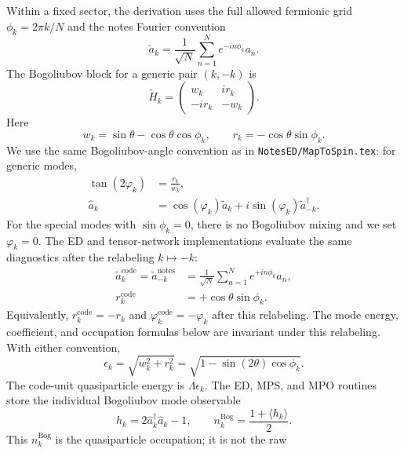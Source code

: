 \documentclass[aps,pra,twocolumn,superscriptaddress,nolongbibliography,nobalancelastpage,10pt]{revtex4-2}
\begin{document}
Within a fixed sector, the derivation uses the full allowed fermionic grid
$\phi_k=2\pi k/N$ and the notes Fourier convention
\begin{equation}
	\tilde a_k=\frac{1}{\sqrt N}\sum_{n=1}^{N}e^{-in\phi_k}a_n .
\end{equation}
The Bogoliubov block for a generic pair $(k,-k)$ is
\begin{equation}
	\tilde H_k=
	\begin{pmatrix}
		w_k & i r_k\\
		-i r_k & -w_k
	\end{pmatrix}.
\end{equation}
Here
\begin{equation}
	w_k=\sin\theta-\cos\theta\cos\phi_k,\qquad
	r_k=-\cos\theta\sin\phi_k.
\end{equation}
We use the same Bogoliubov-angle convention as in
\texttt{NotesED/MapToSpin.tex}: for generic modes,
\begin{align}
	\tan(2\varphi_k)&=\frac{r_k}{w_k},\label{eq:tn_bogoliubov_angle}\\
	\hat a_k&=\cos(\varphi_k)\tilde a_k
	+i\sin(\varphi_k)\tilde a_{-k}^\dagger .
	\label{eq:tn_bogoliubov_transform}
\end{align}
For the special modes with $\sin\phi_k=0$, there is no Bogoliubov mixing and
we set $\varphi_k=0$.
The ED and tensor-network implementations evaluate the same diagnostics after
the relabeling $k\mapsto -k$:
\begin{align}
	\tilde a^{\mathrm{code}}_k
	=\tilde a^{\mathrm{notes}}_{-k}
	&=\frac{1}{\sqrt N}\sum_{n=1}^{N}e^{+in\phi_k}a_n,\\
	r^{\mathrm{code}}_k&=+\cos\theta\sin\phi_k.
\end{align}
Equivalently, $r^{\mathrm{code}}_k=-r_k$ and
$\varphi_k^{\mathrm{code}}=-\varphi_k$ after this relabeling.  The mode
energy, coefficient, and occupation formulas below are invariant under this
relabeling.  With either convention,
\begin{equation}
	\epsilon_k=\sqrt{w_k^2+r_k^2}
	=\sqrt{1-\sin(2\theta)\cos\phi_k}.
\end{equation}
The code-unit quasiparticle energy is $\Lambda\epsilon_k$.  The ED, MPS, and MPO
routines store the individual Bogoliubov mode observable
\begin{equation}
	h_k=2\hat a_k^\dagger\hat a_k-1,\qquad
	n_k^{\mathrm{Bog}}=\frac{1+\langle h_k\rangle}{2}.
\end{equation}
This $n_k^{\mathrm{Bog}}$ is the quasiparticle occupation; it is not the raw
\end{document}
